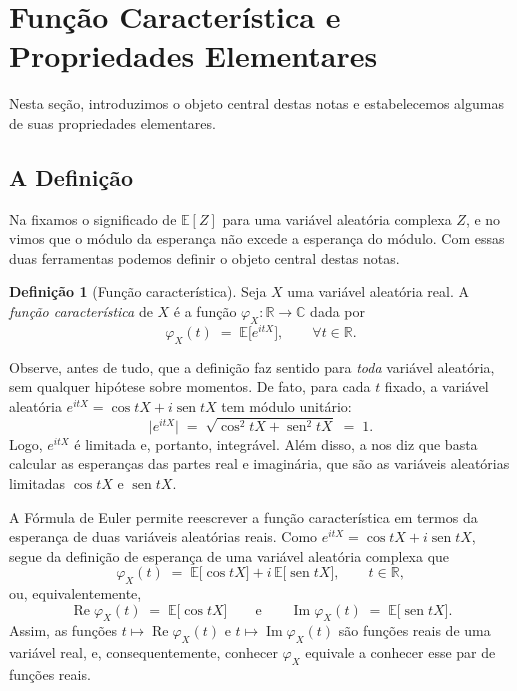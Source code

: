 \documentclass[12pt,portuguese]{article}
\theoremstyle{definition}
\newtheorem{definition}[definition]{Definição}
\theoremstyle{plainexercise}
\theoremstyle{starredexercise}
\theoremstyle{definition}
\renewcommand{\sin}{\operatorname{sen}}
\begin{document}
\section{Função Característica e Propriedades Elementares}\label{sec:definicao}

Nesta seção, introduzimos o objeto central destas notas e estabelecemos algumas de suas
propriedades elementares. 

\subsection{A Definição}\label{subsec:fc-definicao}

Na  fixamos o significado de $\mathbb{E}[Z]$ para uma
variável aleatória complexa $Z$, e no  vimos que o
módulo da esperança não excede a esperança do módulo. Com essas duas
ferramentas podemos definir o objeto central destas notas.

\begin{definition}[Função característica]\label{def:func-caracteristica}
Seja $X$ uma variável aleatória real. A \emph{função característica} de $X$ é a função
$\varphi_{X}\colon\mathbb{R}\to\mathbb{C}$ dada por
\[
  \varphi_{X}(t) \;=\; \mathbb{E}\bigl[e^{itX}\bigr],
  \qquad \forall t\in\mathbb{R}.
\]
\end{definition}

Observe, antes de tudo, que a definição faz sentido para \emph{toda} variável
aleatória, sem qualquer hipótese sobre momentos. De fato, para cada $t$
fixado, a variável aleatória $e^{itX} = \cos tX + i\sin tX$ tem módulo
unitário:
\[
  \bigl|e^{itX}\bigr| \;=\; \sqrt{\cos^2 tX + \sin^2 tX} \;=\; 1 .
\]
Logo, $e^{itX}$ é limitada e, portanto, integrável. Além disso, a 
nos diz que basta calcular as esperanças das partes real e imaginária,
que são as variáveis aleatórias limitadas $\cos tX$ e $\sin tX$.

A Fórmula de Euler permite reescrever a função característica em termos da esperança de
duas variáveis aleatórias reais.
Como $e^{itX} = \cos tX + i\sin tX$, segue da definição de esperança de uma variável
aleatória complexa que
\begin{equation}\label{eq:fc-partes}
  \varphi_{X}(t) \;=\; \mathbb{E}\bigl[\cos tX\bigr] + i\,\mathbb{E}\bigl[\sin tX\bigr],
  \qquad t\in\mathbb{R},
\end{equation}
ou, equivalentemente,
\[
  \operatorname{Re}\varphi_{X}(t) \;=\; \mathbb{E}\bigl[\cos tX\bigr]
  \qquad\text{e}\qquad
  \operatorname{Im}\varphi_{X}(t) \;=\; \mathbb{E}\bigl[\sin tX\bigr].
\]
Assim, as funções $t\longmapsto \operatorname{Re}\varphi_{X}(t)$ e 
$t\longmapsto \operatorname{Im}\varphi_{X}(t)$ são funções
reais de uma variável real, e, consequentemente, conhecer $\varphi_{X}$ equivale a conhecer esse par de
funções reais.
\end{document}
